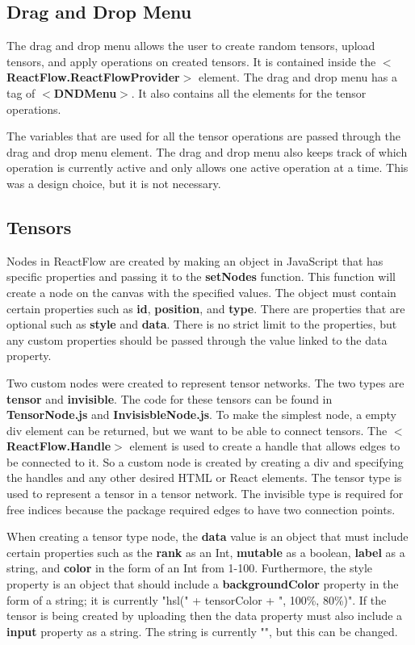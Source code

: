 \documentclass{juliacon}
\begin{document}
\begin{appendix}
\subsection{Drag and Drop Menu}
The drag and drop menu allows the user to create random tensors, upload tensors, and apply operations on created tensors. It is contained inside the $<$\textbf{ReactFlow.ReactFlowProvider}$>$ element. The drag and drop menu has a tag of $<$\textbf{DNDMenu}$>$. It also contains all the elements for the tensor operations.

The variables that are used for all the tensor operations are passed through the drag and drop menu element. The drag and drop menu also keeps track of which operation is currently active and only allows one active operation at a time. This was a design choice, but it is not necessary.

\subsection{Tensors}
Nodes in ReactFlow are created by making an object in JavaScript that has specific properties and passing it to the \textbf{setNodes} function. This function will create a node on the canvas with the specified values. The object must contain certain properties such as \textbf{id}, \textbf{position}, and \textbf{type}. There are properties that are optional such as \textbf{style} and \textbf{data}. There is no strict limit to the properties, but any custom properties should be passed through the value linked to the data property.

Two custom nodes were created to represent tensor networks. The two types are \textbf{tensor} and \textbf{invisible}. The code for these tensors can be found in \textbf{TensorNode.js} and \textbf{InvisisbleNode.js}. To make the simplest node, a empty div element can be returned, but we want to be able to connect tensors. The $<$\textbf{ReactFlow.Handle}$>$ element is used to create a handle that allows edges to be connected to it. So a custom node is created by creating a div and specifying the handles and any other desired HTML or React elements. The tensor type is used to represent a tensor in a tensor network. The invisible type is required for free indices because the package required edges to have two connection points.

When creating a tensor type node, the \textbf{data} value is an object that must include certain properties such as the \textbf{rank} as an Int, \textbf{mutable} as a boolean, \textbf{label} as a string, and \textbf{color} in the form of an Int from 1-100. Furthermore, the style property is an object that should include a \textbf{backgroundColor} property in the form of a string; it is currently "hsl(" + tensorColor + ", 100\%, 80\%)". If the tensor is being created by uploading then the data property must also include a \textbf{input} property as a string. The string is currently "", but this can be changed. 


\end{appendix}
\end{document}
